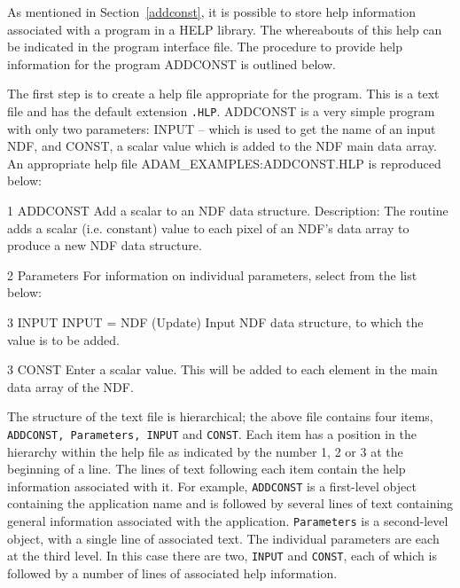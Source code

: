 \documentclass[twoside,11pt,nolof]{starlink}
\begin{document}
As mentioned in Section~\ref{addconst}, it is possible to store help
information associated with a program in a HELP library.
The whereabouts of this help can be indicated in the program interface file.
The procedure to provide help information for the program
ADDCONST is outlined below.

The first step is to create a help file appropriate for the  program.
This is a text file and has the default extension \texttt{.HLP}.
ADDCONST is a very simple program with only two parameters: INPUT -- which
is used to  get the name of an input NDF, and CONST,
a scalar value which is added to the NDF main data array.
An appropriate  help file ADAM\_EXAMPLES:ADDCONST.HLP is reproduced below:
\begin{terminalv}
1 ADDCONST
Add a scalar to an NDF data structure.
Description:
  The routine adds a scalar (i.e. constant) value to each pixel of
  an NDF's data array to produce a new NDF data structure.

2 Parameters
For information on individual parameters, select from the list below:

3 INPUT
INPUT = NDF (Update)
  Input NDF data structure, to which the value is to be added.

3 CONST
Enter a scalar value.
This will be added to each element in the main data array of the NDF.
\end{terminalv}
The structure of the text file is hierarchical;
the above file contains four items, \texttt{ADDCONST, Parameters, INPUT} and
\texttt{CONST}.
Each item has a position in the hierarchy within the
help file  as indicated by the number 1, 2
or 3 at the beginning of a line.
The lines of text following each item contain the help information
associated with it.
For example, \texttt{ADDCONST} is a first-level object containing the application name
and is followed by several lines of text containing general information
associated with the application.
\texttt{Parameters} is a second-level object, with a single line of associated text.
The individual parameters are each at the third level.
In this case there are two, \texttt{INPUT} and \texttt{CONST}, each of which
is followed by a number of lines of associated help
information.
\end{document}
